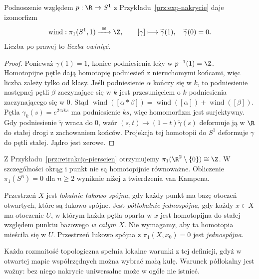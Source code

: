 \begin{twierdzenie}
\label{thm:pi1-okragu}
Podnoszenie względem $p:\R\to S^1$
z Przykładu~\ref{prz:exp-nakrycie} daje
izomorfizm
\[
 \operatorname{wind}:\pi_1(S^1,1)\xrightarrow{\ \cong\ }\Z,
 \qquad [\gamma]\longmapsto
 \widetilde\gamma(1),
 \quad \widetilde\gamma(0)=0.
\]
Liczba po prawej to \emph{liczba owinięć}.
\end{twierdzenie}
\begin{proof}
Ponieważ $\gamma(1)=1$, koniec
podniesienia leży w $p^{-1}(1)=\Z$.
Homotopijne pętle dają homotopię
podniesień z nieruchomymi końcami,
więc liczba zależy tylko od klasy.
Jeśli podniesienie $\alpha$ kończy się w $k$,
to podniesienie następnej pętli $\beta$
zaczynające się w $k$ jest przesunięciem
o $k$ podniesienia zaczynającego się w $0$.
Stąd $\operatorname{wind}([\alpha*\beta])
=\operatorname{wind}([\alpha])
+\operatorname{wind}([\beta])$.
Pętla $\gamma_k(s)=e^{2\pi i ks}$
ma podniesienie $ks$, więc homomorfizm
jest surjektywny. Gdy podniesienie
$\widetilde\gamma$ wraca do $0$,
wzór $(s,t)\mapsto(1-t)\widetilde\gamma(s)$
deformuje ją w $\R$ do stałej drogi
z zachowaniem końców. Projekcja tej
homotopii do $S^1$ deformuje $\gamma$
do pętli stałej. Jądro jest zerowe.
\end{proof}

Z Przykładu~\ref{prz:retrakcja-pierscien}
otrzymujemy $\pi_1(\R^2\setminus\{0\})\cong\Z$.
W szczególności okrąg i punkt nie są
homotopijnie równoważne. Obliczenie
$\pi_1(S^{n})=0$ dla $n\geq2$
wyniknie niżej z twierdzenia van Kampena.

\begin{definicja}
\label{def:semilokalnie-prosto-spojna}
Przestrzeń $X$ jest \emph{lokalnie łukowo spójna},
gdy każdy punkt ma bazę otoczeń otwartych,
które są łukowo spójne. Jest
\emph{półlokalnie jednospójna}, gdy każdy
$x\in X$ ma otoczenie $U$, w którym
każda pętla oparta w $x$ jest homotopijna do stałej
względem punktu bazowego \emph{w całym $X$}. Nie wymagamy, aby
ta homotopia mieściła się w $U$.
Przestrzeń łukowo spójna z
$\pi_1(X,x_0)=0$ jest \emph{jednospójna}.
\end{definicja}

Każda rozmaitość topologiczna spełnia
lokalne warunki z tej definicji, gdyż
w otwartej mapie współrzędnych można
wybrać małą kulę. Warunek półlokalny
jest ważny: bez niego nakrycie uniwersalne
może w ogóle nie istnieć.

